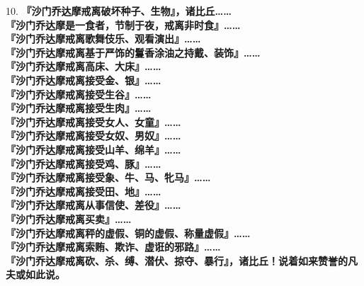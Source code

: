 {\Large 10.} \textbf{『沙门乔达摩戒离破坏种子、生物』，诸比丘……}\\
\textbf{『沙门乔达摩是一食者，节制于夜，戒离非时食』……}\\
\textbf{『沙门乔达摩戒离歌舞伎乐、观看演出』……}\\
\textbf{『沙门乔达摩戒离基于严饰的鬘香涂油之持戴、装饰』……}\\
\textbf{『沙门乔达摩戒离高床、大床』……}\\
\textbf{『沙门乔达摩戒离接受金、银』……}\\
\textbf{『沙门乔达摩戒离接受生谷』……}\\
\textbf{『沙门乔达摩戒离接受生肉』……}\\
\textbf{『沙门乔达摩戒离接受女人、女童』……}\\
\textbf{『沙门乔达摩戒离接受女奴、男奴』……}\\
\textbf{『沙门乔达摩戒离接受山羊、绵羊』……}\\
\textbf{『沙门乔达摩戒离接受鸡、豚』……}\\
\textbf{『沙门乔达摩戒离接受象、牛、马、牝马』……}\\
\textbf{『沙门乔达摩戒离接受田、地』……}\\
\textbf{『沙门乔达摩戒离从事信使、差役』……}\\
\textbf{『沙门乔达摩戒离买卖』……}\\
\textbf{『沙门乔达摩戒离秤的虚假、铜的虚假、称量虚假』……}\\
\textbf{『沙门乔达摩戒离索贿、欺诈、虚诳的邪路』……}\\
\textbf{『沙门乔达摩戒离砍、杀、缚、潜伏、掠夺、暴行』，诸比丘！说着如来赞誉的凡夫或如此说。}

